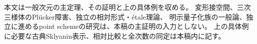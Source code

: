 本文は一般次元の主定理、その証明と上の具体例を収める。
変形接空間、三次三様体のPl\"ucker障害、独立の相対形式・étale理論、
明示量子化族の一般論、独立に進めるpoint schemeの研究は、本稿の主証明の入力としない。
上の具体例に必要な古典Sklyanin表示、相対比較と全次数の同定は本稿内に記す。












